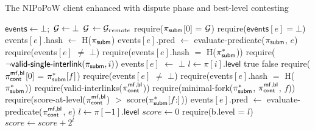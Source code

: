 \begin{algorithm}
    \caption{\label{alg:dispute-best-level}The \textsf{NIPoPoW} client enhanced
        with dispute phase and best-level contesting}

    \begin{algorithmic}[1]

    \State $\textsf{events} \gets \bot;$ $\mathcal{G} \gets \bot$
        \State $\mathcal{G}$ $\gets \mathcal{G}_{remote}$
    \EndFunction
        \State \textsf{require}($\mathsf{\pi_{subm}}$[0] = $\mathcal{G}$)
        \State \textsf{require}($\textsf{events$[e]$} = \bot$)
        \State \textsf{events$[e]$.hash} $\gets$ \textsf{H}($\mathsf{\pi_{subm}}$)
        \State \textsf{events$[e]$.pred} $\gets$
        \textsf{evaluate-predicate}(\textsf{$\mathsf{\pi_{subm}}$}, $e$)
    \EndFunction
        \State \textsf{require}(\textsf{events}$[e]$ $\ne$ $\bot$)
        \State \textsf{require}(\textsf{events$[e]$.hash} $=$ \textsf{H}($\mathsf{\pi_{subm}^*}$))
        \State \textsf{require}($\neg \textsf{valid-single-interlink}(\mathsf{\pi_{subm}}, i)$)
        \State \textsf{events$[e]$} $\gets$ $\bot$
    \EndFunction
        \State $l\gets\pi[i].\mathsf{level}$
        \State \Return true
        \EndIf
        \State \Return false
    \EndFunction
        \State \textsf{require}($\mathsf{\pi_{cont}^{mf, bl}}$[0] = $\mathsf{\pi_{subm}^*}[f]$)
        \State \textsf{require}(\textsf{events}$[e]$ $\ne$ $\bot$)
        \State \textsf{require}(\textsf{events$[e]$.hash} $=$ \textsf{H}($\mathsf{\pi_{subm}^*}$))
        \State \textsf{require}(\textsf{valid-interlinks}($\mathsf{\pi_{cont}^{mf, bl}}$))
        \State \textsf{require}(\textsf{minimal-fork}($\mathsf{\pi_{subm}^*}$,
        $\mathsf{\pi_{cont}^{mf, bl}}$, $f$))
        \State \textsf{require}(\textsf{score-at-level}($\mathsf{\pi_{cont}^{mf, bl}}$)
        $>$ \textsf{score}($\mathsf{\pi_{subm}^*}[f{:}]$))
        \State \textsf{events$[e]$.pred} $\gets$
            \textsf{evaluate-predicate}($\mathsf{\pi_{cont}^{mf, bl}}$, $e$)
    \EndFunction
        \State $l \gets \pi[-1].\textsf{level}$
        \State $score \gets 0$
            \State \textsf{require}(b.\textsf{level} = $l$)
            \State $score \gets score {+} 2^l$
        \EndFor
        \State {}
    \EndFunction
    \EndContract
    \vskip8pt
    \end{algorithmic}
\end{algorithm}

